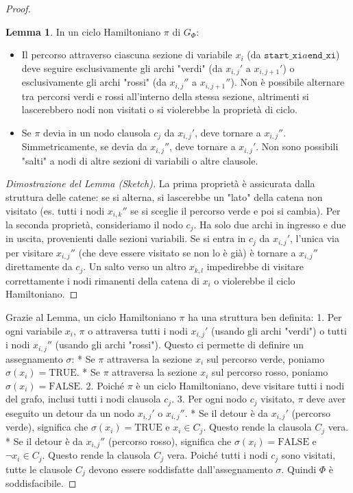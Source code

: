\documentclass[a4paper]{article}
\theoremstyle{definition} %
\newtheorem{lemma}{Lemma}
\begin{document}
\begin{proof}
\begin{lemma}
In un ciclo Hamiltoniano $\pi$ di $G_\Phi$:
\begin{itemize}
    \item Il percorso attraverso ciascuna sezione di variabile $x_i$ (da $\texttt{start\_xi} a \texttt{end\_xi}$) deve seguire esclusivamente gli archi "verdi" (da $x_{i,j}'$ a $x_{i,j+1}'$) o esclusivamente gli archi "rossi" (da $x_{i,j}''$ a $x_{i,j+1}''$). Non è possibile alternare tra percorsi verdi e rossi all'interno della stessa sezione, altrimenti si lascerebbero nodi non visitati o si violerebbe la proprietà di ciclo.
    \item Se $\pi$ devia in un nodo clausola $c_j$ da $x_{i,j}'$, deve tornare a $x_{i,j}''$. Simmetricamente, se devia da $x_{i,j}''$, deve tornare a $x_{i,j}'$. Non sono possibili "salti" a nodi di altre sezioni di variabili o altre clausole.
\end{itemize}
\end{lemma}
\begin{proof}[Dimostrazione del Lemma (Sketch)]
La prima proprietà è assicurata dalla struttura delle catene: se si alterna, si lascerebbe un "lato" della catena non visitato (es. tutti i nodi $x_{i,k}''$ se si sceglie il percorso verde e poi si cambia). Per la seconda proprietà, consideriamo il nodo $c_j$. Ha solo due archi in ingresso e due in uscita, provenienti dalle sezioni variabili. Se si entra in $c_j$ da $x_{i,j}'$, l'unica via per visitare $x_{i,j}''$ (che deve essere visitato se non lo è già) è tornare a $x_{i,j}''$ direttamente da $c_j$. Un salto verso un altro $x_{k,l}$ impedirebbe di visitare correttamente i nodi rimanenti della catena di $x_i$ o violerebbe il ciclo Hamiltoniano.
\end{proof}

Grazie al Lemma, un ciclo Hamiltoniano $\pi$ ha una struttura ben definita:
1.  Per ogni variabile $x_i$, $\pi$ o attraversa tutti i nodi $x_{i,j}'$ (usando gli archi "verdi") o tutti i nodi $x_{i,j}''$ (usando gli archi "rossi"). Questo ci permette di definire un assegnamento $\sigma$:
    *   Se $\pi$ attraversa la sezione $x_i$ sul percorso verde, poniamo $\sigma(x_i) = \text{TRUE}$.
    *   Se $\pi$ attraversa la sezione $x_i$ sul percorso rosso, poniamo $\sigma(x_i) = \text{FALSE}$.
2.  Poiché $\pi$ è un ciclo Hamiltoniano, deve visitare tutti i nodi del grafo, inclusi tutti i nodi clausola $c_j$.
3.  Per ogni nodo $c_j$ visitato, $\pi$ deve aver eseguito un detour da un nodo $x_{i,j}'$ o $x_{i,j}''$.
    *   Se il detour è da $x_{i,j}'$ (percorso verde), significa che $\sigma(x_i)=\text{TRUE}$ e $x_i \in C_j$. Questo rende la clausola $C_j$ vera.
    *   Se il detour è da $x_{i,j}''$ (percorso rosso), significa che $\sigma(x_i)=\text{FALSE}$ e $\neg x_i \in C_j$. Questo rende la clausola $C_j$ vera.
Poiché tutti i nodi $c_j$ sono visitati, tutte le clausole $C_j$ devono essere soddisfatte dall'assegnamento $\sigma$.
Quindi $\Phi$ è soddisfacibile.
\end{proof}
\end{document}
